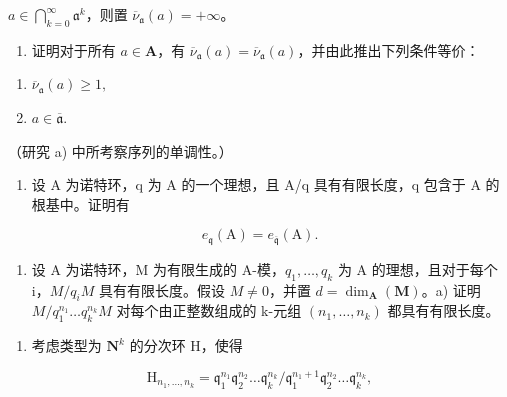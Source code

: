 \(a \in \bigcap_{k=0}^{\infty} \mathfrak{a}^{k}\)，则置 \(\overline{\nu}_{\mathfrak{a}}(a) = +\infty\)。

\begin{enumerate}
\def\labelenumi{\alph{enumi})}
\setcounter{enumi}{1}
\tightlist
\item
  证明对于所有 \(a \in \mathbf{A}\)，有 \(\overline{\nu}_{\mathfrak{a}}(a) = \overline{\nu}_{\mathfrak{a}}(a)\)，并由此推出下列条件等价：
\end{enumerate}

\begin{enumerate}
\def\labelenumi{(\roman{enumi})}
\item
  \(\overline{\nu}_{\mathfrak{a}}(a)\geqslant 1,\)
\item
  \(a \in \overline{\mathfrak{a}}\).
\end{enumerate}

（研究 a) 中所考察序列的单调性。）

\begin{enumerate}
\def\labelenumi{\arabic{enumi})}
\setcounter{enumi}{18}
\tightlist
\item
  设 A 为诺特环，q 为 A 的一个理想，且 A/q 具有有限长度，q 包含于 A 的根基中。证明有
\end{enumerate}

\[
e _ {\mathfrak {q}} (\mathrm{A}) = e _ {\overline {{\mathfrak {q}}}} (\mathrm{A}).
\]

\begin{enumerate}
\def\labelenumi{\arabic{enumi})}
\setcounter{enumi}{19}
\tightlist
\item
  设 A 为诺特环，M 为有限生成的 A-模，\(q_{1}, \ldots, q_{k}\) 为 A 的理想，且对于每个 i，\(M/q_{i}M\) 具有有限长度。假设 \(M \neq 0\)，并置 \(d = \dim_{\mathbf{A}}(\mathbf{M})\)。a) 证明 \(M/q_{1}^{n_{1}} \ldots q_{k}^{n_{k}}M\) 对每个由正整数组成的 k-元组 \((n_{1}, \ldots, n_{k})\) 都具有有限长度。
\end{enumerate}

\begin{enumerate}
\def\labelenumi{\alph{enumi})}
\setcounter{enumi}{1}
\tightlist
\item
  考虑类型为 \(\mathbf{N}^k\) 的分次环 H，使得
\end{enumerate}

\[
\mathrm{H} _ {n _ {1}, \dots , n _ {k}} = \mathfrak {q} _ {1} ^ {n _ {1}} \mathfrak {q} _ {2} ^ {n _ {2}} \dots \mathfrak {q} _ {k} ^ {n _ {k}} / \mathfrak {q} _ {1} ^ {n _ {1} + 1} \mathfrak {q} _ {2} ^ {n _ {2}} \dots \mathfrak {q} _ {k} ^ {n _ {k}},
\]

